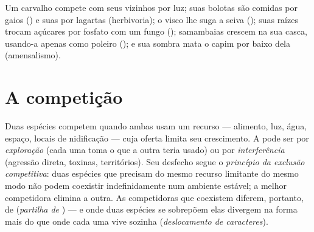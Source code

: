 \begin{example}\label{ex:b1:species-interactions:oak}
Um carvalho compete com seus vizinhos por luz; suas bolotas são
comidas por gaios () e suas  por lagartas (herbivoria);
o visco lhe suga a seiva (); suas raízes trocam açúcares
por fosfato com um fungo (); samambaias crescem na sua
casca, usando-a apenas como poleiro (); e sua sombra mata
o capim por baixo dela (amensalismo).
\end{example}

\section{A competição}

\begin{definition}\label{def:b1:species-interactions:competition}
Duas espécies competem quando ambas usam um recurso --- alimento, luz,
água, espaço, locais de nidificação --- cuja oferta limita seu
crescimento. A  pode ser por \emph{exploração} (cada uma
toma o que a outra teria usado) ou por \emph{interferência} (agressão
direta, toxinas, territórios). Seu desfecho segue o \emph{princípio da
exclusão competitiva}: duas espécies que precisam do mesmo recurso
limitante do mesmo modo não podem coexistir indefinidamente num
ambiente estável; a melhor competidora elimina a outra. As
competidoras que coexistem diferem, portanto, de  (\emph{partilha
de }) --- e onde duas espécies se sobrepõem elas divergem na
forma mais do que onde cada uma vive sozinha (\emph{deslocamento de
caracteres}).
\end{definition}

